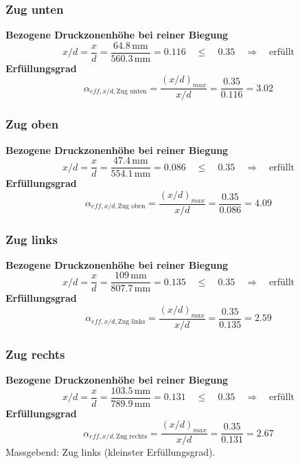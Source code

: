 \documentclass[11pt,a4paper]{article}
\begin{document}
\subsubsection{Zug unten}
\noindent\textbf{Bezogene Druckzonenhöhe bei reiner Biegung}
\begin{equation*}
x/d = \frac{x}{d} = \frac{64.8\,\mathrm{mm}}{560.3\,\mathrm{mm}} = 0.116 \quad \le \quad 0.35 \quad \Rightarrow \quad \text{erfüllt}
\end{equation*}
\noindent\textbf{Erfüllungsgrad}
\begin{equation*}
\alpha_{eff,x/d,\text{Zug unten}} = \frac{\left(x/d\right)_{max}}{x/d} = \frac{0.35}{0.116} = 3.02
\end{equation*}
\subsubsection{Zug oben}
\noindent\textbf{Bezogene Druckzonenhöhe bei reiner Biegung}
\begin{equation*}
x/d = \frac{x}{d} = \frac{47.4\,\mathrm{mm}}{554.1\,\mathrm{mm}} = 0.086 \quad \le \quad 0.35 \quad \Rightarrow \quad \text{erfüllt}
\end{equation*}
\noindent\textbf{Erfüllungsgrad}
\begin{equation*}
\alpha_{eff,x/d,\text{Zug oben}} = \frac{\left(x/d\right)_{max}}{x/d} = \frac{0.35}{0.086} = 4.09
\end{equation*}
\subsubsection{Zug links}
\noindent\textbf{Bezogene Druckzonenhöhe bei reiner Biegung}
\begin{equation*}
x/d = \frac{x}{d} = \frac{109\,\mathrm{mm}}{807.7\,\mathrm{mm}} = 0.135 \quad \le \quad 0.35 \quad \Rightarrow \quad \text{erfüllt}
\end{equation*}
\noindent\textbf{Erfüllungsgrad}
\begin{equation*}
\alpha_{eff,x/d,\text{Zug links}} = \frac{\left(x/d\right)_{max}}{x/d} = \frac{0.35}{0.135} = 2.59
\end{equation*}
\subsubsection{Zug rechts}
\noindent\textbf{Bezogene Druckzonenhöhe bei reiner Biegung}
\begin{equation*}
x/d = \frac{x}{d} = \frac{103.5\,\mathrm{mm}}{789.9\,\mathrm{mm}} = 0.131 \quad \le \quad 0.35 \quad \Rightarrow \quad \text{erfüllt}
\end{equation*}
\noindent\textbf{Erfüllungsgrad}
\begin{equation*}
\alpha_{eff,x/d,\text{Zug rechts}} = \frac{\left(x/d\right)_{max}}{x/d} = \frac{0.35}{0.131} = 2.67
\end{equation*}
Massgebend: Zug links (kleinster Erfüllungsgrad).
\end{document}
